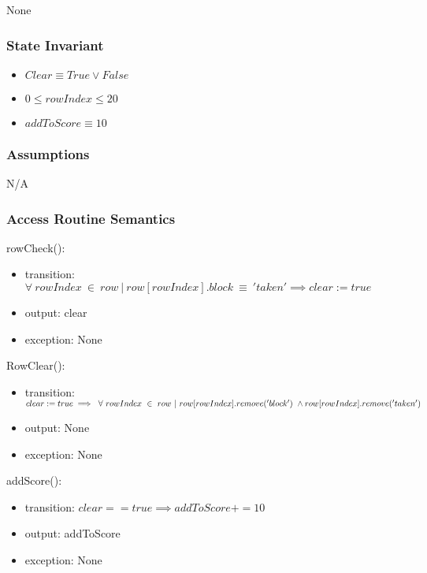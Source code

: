 \documentclass[12pt]{article}
\begin{document}
None

\subsubsection*{State Invariant}

\begin{itemize}
    \item $Clear \equiv True \lor False$
    \item $0 \leq rowIndex \leq 20$
    \item $addToScore \equiv 10$
\end{itemize}

\subsubsection*{Assumptions}

N/A

\subsubsection* {Access Routine Semantics}

\noindent rowCheck():
\begin{itemize}
\item transition: $\forall~ rowIndex ~\in~ row ~|~ row[rowIndex].block ~\equiv~ 'taken' \implies clear := true$
\item output: clear
\item exception: None
\end{itemize}

\noindent RowClear():
\begin{itemize}
\item transition: $ clear := true \implies ~\forall~ rowIndex ~\in~ row ~|~ row[rowIndex].remove('block') ~\land~ \\row[rowIndex].remove('taken')$
\item output: None
\item exception: None
\end{itemize}

\noindent addScore():
\begin{itemize}
\item transition: $ clear == true \implies addToScore += 10$
\item output: addToScore
\item exception: None
\end{itemize}


\newpage
\end{document}
